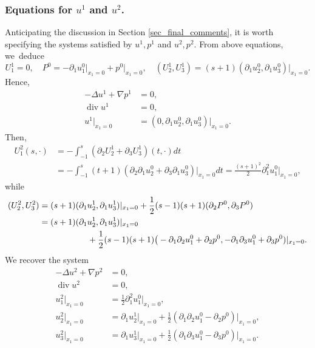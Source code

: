 \documentclass[JEP,XML,SOM,Unicode,NoEqCountersInSection,published]{cedram}
\renewcommand{\div}{\operatorname{div}}
\theoremstyle{plain}
\theoremstyle{definition}
\let\pa\partial
\let\na\nabla
\begin{document}
\subsubsection*{Equations for $u^1$ and $u^2$.}
Anticipating the discussion in Section \ref{sec_final_comments}, it is worth specifying the systems satisfied by $u^1,p^1$ and $u^2,p^2$. From above equations, we~deduce
\[
U^1_1 = 0, \quad P^0 = -\pa_1 u^0_1\vert_{x_1=0} + p^0\vert_{x_1=0}, \quad (U^1_2, U^1_3) = (s+1) (\pa_1 u^0_2,\pa_1 u^0_3)\vert_{x_1=0}.
\]
Hence,
\begin{equation} \label{systemu1}
\begin{aligned}
-\Delta u^1 + \na p^1 & = 0, \\
\div u^1 & = 0, \\
u^1\vert_{x_1=0} & = (0,\pa_1 u^0_2, \pa_1 u^0_3)\vert_{x_1=0}.
\end{aligned}
\end{equation}
Then,
\begin{align*}
U^2_1(s,\cdot) &= - \int_{-1}^s (\pa_2 U^{1}_2 + \pa_3 U^{1}_3)(t,\cdot) dt \\
& = - \int_{-1}^s (t+1)(\pa_2 \pa_1 u^0_2 + \pa_3 \pa_1 u^0_3)\vert_{x_1=0}dt = \frac{(s+1)^2}{2} \pa^2_1 u^0_1\vert_{x_1=0},
\end{align*}
while
\begin{align*}
(U^2_2, U^2_3)&= (s+1) (\pa_1 u^1_2, \pa_1 u^1_3)\vert_{x_1=0} + \frac{1}{2} (s-1) (s+1) (\pa_2 P^0, \pa_3 P^0) \\
& = (s+1) (\pa_1 u^1_2, \pa_1 u^1_3)\vert_{x_1=0}\\
&\hspace*{2cm} + \frac{1}{2} (s-1) (s+1) \big(-\pa_1\pa_2 u^0_1 + \pa_2 p^0, -\pa_1\pa_3 u^0_1 + \pa_3 p^0)\vert_{x_1=0}.
\end{align*}
We recover the system
\begin{equation} \label{systemu2}
\begin{aligned}
-\Delta u^2 + \na p^2 & = 0, \\
\div u^2 & = 0, \\
u^2_1\vert_{x_1=0} & = \frac{1}{2}\pa^2_1 u^0_1\vert_{x_1=0}, \\
u^2_2\vert_{x_1=0} & = \pa_1 u^1_2\vert_{x_1=0} + \frac{1}{2}(\pa_1\pa_2 u^0_1 - \pa_2 p^0)\vert_{x_1=0},\\
u^2_3\vert_{x_1=0} & = \pa_1 u^1_3\vert_{x_1=0} + \frac{1}{2}(\pa_1\pa_3 u^0_1 - \pa_3 p^0)\vert_{x_1=0}.
\end{aligned}
\end{equation}
\end{document}
